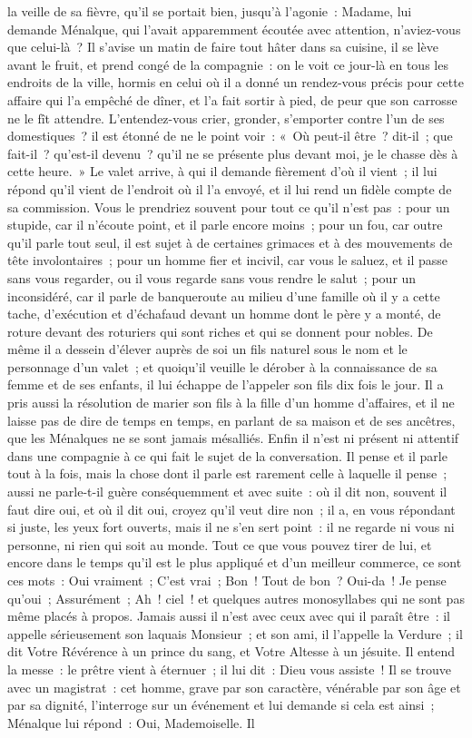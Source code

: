 \documentclass[french,twoside]{book} %
\begin{document}
la veille de sa fièvre, qu’il se portait bien, jusqu’à l’agonie : Madame, lui demande Ménalque, qui l’avait apparemment écoutée avec attention, n’aviez-vous que celui-là ? Il s’avise un matin de faire tout hâter dans sa cuisine, il se lève avant le fruit, et prend congé de la compagnie : on le voit ce jour-là en tous les endroits de la ville, hormis en celui où il a donné un rendez-vous précis pour cette affaire qui l’a empêché de dîner, et l’a fait sortir à pied, de peur que son carrosse ne le fît attendre. L'entendez-vous crier, gronder, s’emporter contre l’un de ses domestiques ? il est étonné de ne le point voir : « Où peut-il être ? dit-il ; que fait-il ? qu’est-il devenu ? qu’il ne se présente plus devant moi, je le chasse dès à cette heure. » Le valet arrive, à qui il demande fièrement d’où il vient ; il lui répond qu’il vient de l’endroit où il l’a envoyé, et il lui rend un fidèle compte de sa commission. Vous le prendriez souvent pour tout ce qu’il n’est pas : pour un stupide, car il n’écoute point, et il parle encore moins ; pour un fou, car outre qu’il parle tout seul, il est sujet à de certaines grimaces et à des mouvements de tête involontaires ; pour un homme fier et incivil, car vous le saluez, et il passe sans vous regarder, ou il vous regarde sans vous rendre le salut ; pour un inconsidéré, car il parle de banqueroute au milieu d’une famille où il y a cette tache, d’exécution et d’échafaud devant un homme dont le père y a monté, de roture devant des roturiers qui sont riches et qui se donnent pour nobles. De même il a dessein d’élever auprès de soi un fils naturel sous le nom et le personnage d’un valet ; et quoiqu’il veuille le dérober à la connaissance de sa femme et de ses enfants, il lui échappe de l’appeler son fils dix fois le jour. Il a pris aussi la résolution de marier son fils à la fille d’un homme d’affaires, et il ne laisse pas de dire de temps en temps, en parlant de sa maison et de ses ancêtres, que les Ménalques ne se sont jamais mésalliés. Enfin il n’est ni présent ni attentif dans une compagnie à ce qui fait le sujet de la conversation. Il pense et il parle tout à la fois, mais la chose dont il parle est rarement celle à laquelle il pense ; aussi ne parle-t-il guère conséquemment et avec suite : où il dit non, souvent il faut dire oui, et où il dit oui, croyez qu’il veut dire non ; il a, en vous répondant si juste, les yeux fort ouverts, mais il ne s’en sert point : il ne regarde ni vous ni personne, ni rien qui soit au monde. Tout ce que vous pouvez tirer de lui, et encore dans le temps qu’il est le plus appliqué et d’un meilleur commerce, ce sont ces mots : Oui vraiment ; C'est vrai ; Bon ! Tout de bon ? Oui-da ! Je pense qu’oui ; Assurément ; Ah ! ciel ! et quelques autres monosyllabes qui ne sont pas même placés à propos. Jamais aussi il n’est avec ceux avec qui il paraît être : il appelle sérieusement son laquais Monsieur ; et son ami, il l’appelle la Verdure ; il dit Votre Révérence à un prince du sang, et Votre Altesse à un jésuite. Il entend la messe : le prêtre vient à éternuer ; il lui dit : Dieu vous assiste ! Il se trouve avec un magistrat : cet homme, grave par son caractère, vénérable par son âge et par sa dignité, l’interroge sur un événement et lui demande si cela est ainsi ; Ménalque lui répond : Oui, Mademoiselle. Il 
\end{document}
